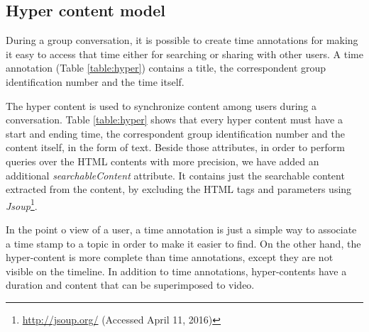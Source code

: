 
\subsection{Hyper content model}

During a group conversation, it is possible to create time annotations for making it easy to access that time either for searching or sharing with other users.
A time annotation (Table \ref{table:hyper}) contains a title, the correspondent group identification number and the time itself.

The hyper content is used to synchronize content among users during a conversation. Table \ref{table:hyper} shows that every hyper content must have a start and ending time, the correspondent group identification number and the content itself, in the form of text. Beside those attributes, in order to perform queries over the \ac{HTML} contents with more precision, we have added an additional \emph{searchableContent} attribute. It contains just the searchable content extracted from the content, by excluding the \ac{HTML} tags and parameters using \emph{Jsoup}\footnote{\url{http://jsoup.org/} (Accessed April 11, 2016)}.

In the point o view of a user, a time annotation is just a simple way to associate a time stamp to a topic in order to make it easier to find. On the other hand, the hyper-content is more complete than time annotations, except they are not visible on the timeline. In addition to time annotations, hyper-contents have a duration and content that can be superimposed to video.


